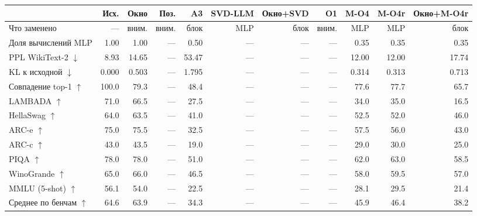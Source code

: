 \begin{tabular}{lrrrrrrrrrr}
\toprule
 & Исх. & Окно & Поз. & A3 & SVD-LLM & Окно+SVD & O1 & M-O4 & M-O4r & Окно+M-O4r \\
\midrule
Что заменено & — & вним. & вним. & блок & MLP & блок & вним. & MLP & MLP & блок \\
Доля вычислений MLP & 1.00 & 1.00 & — & 0.50 & — & — & — & 0.35 & 0.35 & 0.35 \\
PPL WikiText-2 $\downarrow$ & 8.93 & 14.65 & — & 53.47 & — & — & — & 12.00 & 12.00 & 17.74 \\
KL к исходной $\downarrow$ & 0.000 & 0.503 & — & 1.795 & — & — & — & 0.314 & 0.313 & 0.713 \\
Совпадение top-1 $\uparrow$ & 100.0 & 79.3 & — & 48.4 & — & — & — & 77.6 & 77.7 & 65.7 \\
LAMBADA $\uparrow$ & 71.0 & 66.5 & — & 27.5 & — & — & — & 34.0 & 35.0 & 16.5 \\
HellaSwag $\uparrow$ & 64.0 & 63.5 & — & 41.0 & — & — & — & 52.5 & 52.0 & 46.0 \\
ARC-e $\uparrow$ & 75.0 & 75.5 & — & 32.5 & — & — & — & 57.5 & 56.0 & 43.0 \\
ARC-c $\uparrow$ & 43.0 & 43.5 & — & 19.0 & — & — & — & 29.0 & 30.0 & 25.0 \\
PIQA $\uparrow$ & 78.0 & 78.0 & — & 51.0 & — & — & — & 62.0 & 63.0 & 58.5 \\
WinoGrande $\uparrow$ & 65.0 & 66.0 & — & 46.5 & — & — & — & 58.0 & 59.5 & 57.0 \\
MMLU (5-shot) $\uparrow$ & 56.1 & 54.0 & — & 22.5 & — & — & — & 28.1 & 29.5 & 21.4 \\
Среднее по бенчам $\uparrow$ & 64.6 & 63.9 & — & 34.3 & — & — & — & 45.9 & 46.4 & 38.2 \\
\bottomrule
\end{tabular}
